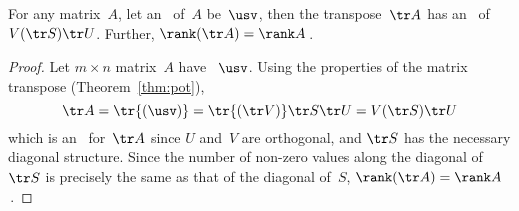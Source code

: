 \begin{theorem} \label{thm:ranktr} 
For any matrix~\(A\), let an \svd\ of~\(A\) be~\(\usv\), then the transpose~\(\tr A\) has an \svd\ of \(V(\tr S)\tr U\). 
Further, \(\rank(\tr A)=\rank A\)\,.
\end{theorem}
\begin{proof} 
Let \(m\times n\) matrix~\(A\) have \svd~\(\usv\).  
Using the properties of the matrix transpose (Theorem~\ref{thm:pot}),
\begin{equation*}
\tr A=\tr{(\usv)}
=\tr{(\tr V)}\tr S\tr U
=V(\tr S)\tr U
\end{equation*}
which is an \svd\ for~\(\tr A\) since \(U\) and~\(V\) are orthogonal, and \(\tr S\) has the necessary diagonal structure. 
Since the number of non-zero values along the diagonal of~\(\tr S\) is precisely the same as that of the diagonal of~\(S\), \(\rank(\tr A)=\rank A\)\,.
\end{proof}


